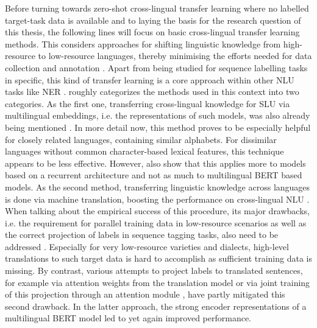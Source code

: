\documentclass[11pt,a4paper,twoside,openright]{scrbook}
\begin{document}
Before turning towards zero-shot cross-lingual transfer learning where no labelled target-task data is available and to laying the basis for the research question of this thesis, the following lines will focus on basic cross-lingual transfer learning methods. This considers approaches for shifting linguistic knowledge from high-resource to low-resource languages, thereby minimising the efforts needed for data collection and annotation \citep{xu-etal-2020-end}. Apart from being studied for sequence labelling tasks in specific, this kind of transfer learning is a core approach within other NLU tasks like NER \citep{upandhyay_atis_zeroshot, schuster-etal-2019-cross-lingual, van-der-goot-etal-2021-masked}. \citet{xu-etal-2020-end} roughly categorizes the methods used in this context into two categories. As the first one, transferring cross-lingual knowledge for SLU via multilingual embeddings, i.e. the representations of such models, was also already being mentioned \citep{van-der-goot-etal-2021-masked}. In more detail now, this method proves to be especially helpful for closely related languages, containing similar alphabets. For dissimilar languages without common character-based lexical features, this technique appears to be less effective. However, \citet{xu-etal-2020-end} also show that this applies more to models based on a recurrent architecture and not as much to multilingual BERT based models. As the second method, transferring linguistic knowledge across languages is done via machine translation, boosting the performance on cross-lingual NLU \citep{schuster-etal-2019-cross-lingual, xu-etal-2020-end, van-der-goot-etal-2021-masked}. When talking about the empirical success of this procedure, its major drawbacks, i.e. the requirement for parallel training data in low-resource scenarios as well as the correct projection of labels in sequence tagging tasks, also need to be addressed \citep{jhan-etal-2022-c5l7, Zampieri_Nakov_Scherrer_2020}. Especially for very low-resource varieties and dialects, high-level translations to such target data is hard to accomplish as sufficient training data is missing. By contrast, various attempts to project labels to translated sentences, for example via attention weights from the translation model \citep{schuster-etal-2019-cross-lingual} or via joint training of this projection through an attention module \citep{xu-etal-2020-end}, have partly mitigated this second drawback. In the latter approach, the strong encoder representations of a multilingual BERT model led to yet again improved performance.
\end{document}
